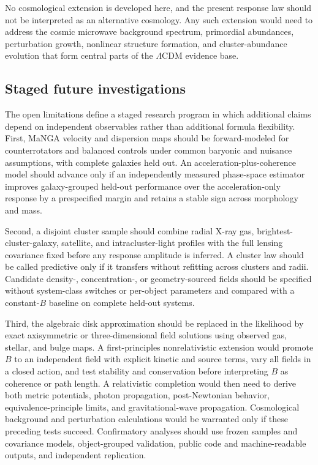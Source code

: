 \documentclass[utf8]{FrontiersinHarvard}
\begin{document}
No cosmological extension is developed here, and the present response law should not be interpreted as an alternative cosmology. Any such extension would need to address the cosmic microwave background spectrum, primordial abundances, perturbation growth, nonlinear structure formation, and cluster-abundance evolution that form central parts of the \(\Lambda\)CDM evidence base.

\subsection{Staged future investigations}\label{staged-future-investigations}

The open limitations define a staged research program in which additional claims depend on independent observables rather than additional formula flexibility. First, MaNGA velocity and dispersion maps should be forward-modeled for counterrotators and balanced controls under common baryonic and nuisance assumptions, with complete galaxies held out. An acceleration-plus-coherence model should advance only if an independently measured phase-space estimator improves galaxy-grouped held-out performance over the acceleration-only response by a prespecified margin and retains a stable sign across morphology and mass.

Second, a disjoint cluster sample should combine radial X-ray gas, brightest-cluster-galaxy, satellite, and intracluster-light profiles with the full lensing covariance fixed before any response amplitude is inferred. A cluster law should be called predictive only if it transfers without refitting across clusters and radii. Candidate density-, concentration-, or geometry-sourced fields should be specified without system-class switches or per-object parameters and compared with a constant-\(B\) baseline on complete held-out systems.

Third, the algebraic disk approximation should be replaced in the likelihood by exact axisymmetric or three-dimensional field solutions using observed gas, stellar, and bulge maps. A first-principles nonrelativistic extension would promote \(B\) to an independent field with explicit kinetic and source terms, vary all fields in a closed action, and test stability and conservation before interpreting \(B\) as coherence or path length. A relativistic completion would then need to derive both metric potentials, photon propagation, post-Newtonian behavior, equivalence-principle limits, and gravitational-wave propagation. Cosmological background and perturbation calculations would be warranted only if these preceding tests succeed. Confirmatory analyses should use frozen samples and covariance models, object-grouped validation, public code and machine-readable outputs, and independent replication.
\end{document}
